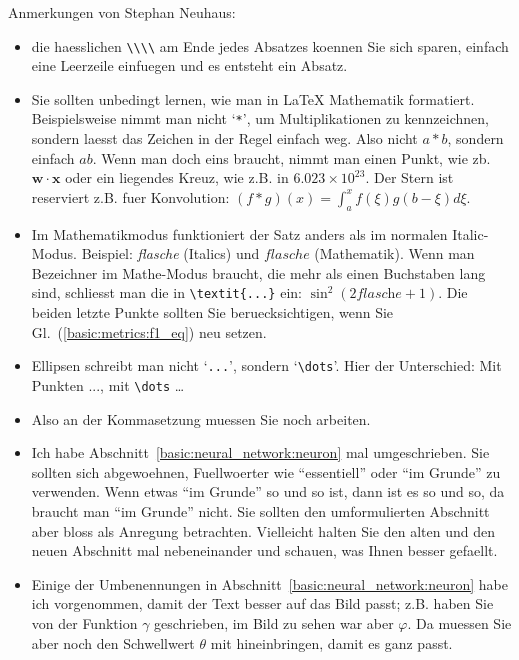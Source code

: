 Anmerkungen von Stephan Neuhaus:

\begin{itemize}

\item die haesslichen \verb+\\\\+ am Ende jedes Absatzes koennen Sie sich sparen, einfach eine Leerzeile einfuegen und es entsteht ein Absatz.

\item Sie sollten unbedingt lernen, wie man in \LaTeX{} Mathematik formatiert. Beispielsweise nimmt man nicht `\verb+*+', um Multiplikationen zu kennzeichnen, sondern laesst das Zeichen in der Regel einfach weg. Also nicht $a*b$, sondern einfach $ab$. Wenn man doch eins braucht, nimmt man einen Punkt, wie zb. $\mathbf{w} \cdot \mathbf{x}$ oder ein liegendes Kreuz, wie z.B. in $6.023\times10^{23}$. Der Stern ist reserviert z.B. fuer Konvolution: $(f*g)(x) = \int_a^x f(\xi)g(b-\xi) d\xi$.

\item Im Mathematikmodus funktioniert der Satz anders als im normalen Italic-Modus. Beispiel: \textit{flasche} (Italics) und $flasche$ (Mathematik). Wenn man Bezeichner im Mathe-Modus braucht, die mehr als einen Buchstaben lang sind, schliesst man die in \verb+\textit{...}+ ein: $\sin^2(2\textit{flasche} + 1)$. Die beiden letzte Punkte sollten Sie beruecksichtigen, wenn Sie Gl.~(\ref{basic:metrics:f1_eq}) neu setzen.

\item Ellipsen schreibt man nicht `\verb+...+', sondern `\verb+\dots+'. Hier der Unterschied: Mit Punkten ..., mit \verb+\dots+ \dots

\item Also an der Kommasetzung muessen Sie noch arbeiten.

\item Ich habe Abschnitt~\ref{basic:neural_network:neuron} mal umgeschrieben. Sie sollten sich abgewoehnen, Fuellwoerter wie "`essentiell"' oder "`im Grunde"' zu verwenden. Wenn etwas "`im Grunde"' so und so ist, dann ist es so und so, da braucht man "`im Grunde"' nicht. Sie sollten den umformulierten Abschnitt aber bloss als Anregung betrachten. Vielleicht halten Sie den alten und den neuen Abschnitt mal nebeneinander und schauen, was Ihnen besser gefaellt.

\item Einige der Umbenennungen in Abschnitt~\ref{basic:neural_network:neuron} habe ich vorgenommen, damit der Text besser auf das Bild passt; z.B. haben Sie von der Funktion $\gamma$ geschrieben, im Bild zu sehen war aber $\varphi$. Da muessen Sie aber noch den Schwellwert $\theta$ mit hineinbringen, damit es ganz passt.


\end{itemize}
